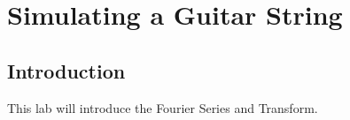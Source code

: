 \chapter{Simulating a Guitar String}

\section{Introduction}

This lab will introduce the Fourier Series and Transform.



